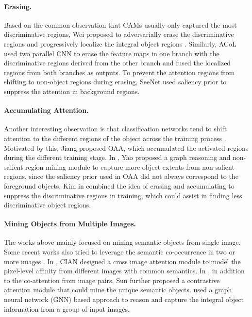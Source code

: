 \paragraph{\textbf{Erasing.}} Based on the common observation that CAMs usually only captured the most discriminative regions, Wei \etal proposed to adversarially erase the discriminative regions and progressively localize the integral object regions \citep{wei2017object}. Similarly, ACoL \citep{zhang2018adversarial} used two parallel CNN to erase the feature maps in one branch with the discriminative regions derived from the other branch and fused the localized regions from both branches as outputs. To prevent the attention regions from shifting to non-object regions during erasing, SeeNet \citep{hou2018self} used saliency prior \citep{hou2017deeply} to suppress the attention in background regions.

\paragraph{\textbf{Accumulating Attention.}} Another interesting observation is that classification networks tend to shift attention to the different regions of the object across the training process \citep{jiang2019integral}. Motivated by this, Jiang \etal proposed OAA, which accumulated the activated regions during the different training stage. In \citep{yao2021non}, Yao \etal proposed a graph reasoning and non-salient region mining module to capture more object extents from non-salient regions, since the saliency prior used in OAA did not always correspond to the foreground objects. Kim \etal in \citep{kim2021discriminative} combined the idea of erasing and accumulating to suppress the discriminative regions in training, which could assist in finding less discriminative object regions.

\paragraph{\textbf{Mining Objects from Multiple Images.}} The works above mainly focused on mining semantic objects from single image. Some recent works also tried to leverage the semantic co-occurrence in two or more images \citep{fan2020cian,li2020group,sun2020mining}. In \citep{fan2020cian}, CIAN designed a cross image attention module to model the pixel-level affinity from different images with common semantics. In \citep{sun2020mining}, in addition to the co-attention from image pairs, Sun \etal further proposed a contrastive attention module that could mine the unique semantic objects. \citep{li2020group} used a graph neural network (GNN) \citep{scarselli2008graph} based approach to reason and capture the integral object information from a group of input images.

